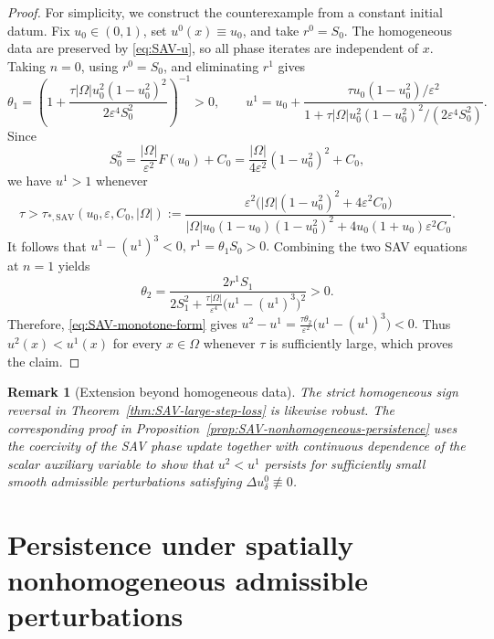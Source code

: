 \documentclass[final, 3p, times]{elsarticle}%
\newcommand{\eps}{\varepsilon}
\newtheorem{remark}[theorem]{Remark}
\begin{document}
\begin{proof}
For simplicity, we construct the counterexample from a constant initial
datum. Fix \(u_0\in(0,1)\), set \(u^0(x)\equiv u_0\), and take
\(r^0=S_0\). The homogeneous data are preserved by \eqref{eq:SAV-u}, so
all phase iterates are independent of \(x\). Taking \(n=0\), using
\(r^0=S_0\), and eliminating \(r^1\) gives
\begin{equation}
    \theta_1
    =\left(1+
    \frac{\tau|\Omega|u_0^2(1-u_0^2)^2}{2\eps^4S_0^2}\right)^{-1}>0,
    \qquad
    u^1
    =u_0+\frac{\tau u_0(1-u_0^2)/\eps^2}
    {1+\tau|\Omega|u_0^2(1-u_0^2)^2/(2\eps^4S_0^2)}.
    \label{eq:SAV-u1-tau}
\end{equation}
Since
\[
    S_0^2=\frac{|\Omega|}{\eps^2}F(u_0)+C_0
    =\frac{|\Omega|}{4\eps^2}(1-u_0^2)^2+C_0,
\]
we have \(u^1>1\) whenever
\begin{equation}
    \tau>\tau_{*,\mathrm{SAV}}(u_0,\eps,C_0,|\Omega|)
    :=
    \frac{\eps^2\bigl(|\Omega|(1-u_0^2)^2+4\eps^2C_0\bigr)}
    {|\Omega|u_0(1-u_0)(1-u_0^2)^2
    +4u_0(1+u_0)\eps^2C_0}.
    \label{eq:SAV-thm-threshold}
\end{equation}
It follows that
$u^1-(u^1)^3<0,\, r^1=\theta_1S_0>0.
$
Combining the two SAV equations at \(n=1\) yields
\[
    \theta_2
    =\frac{2r^1S_1}
    {2S_1^2+\frac{\tau|\Omega|}{\eps^4}
    \bigl(u^1-(u^1)^3\bigr)^2}>0.
\]
Therefore, \eqref{eq:SAV-monotone-form} gives
$
    u^2-u^1=\frac{\tau\theta_2}{\eps^2}\bigl(u^1-(u^1)^3\bigr)<0.
$
Thus \(u^2(x)<u^1(x)\) for every \(x\in\Omega\) whenever \(\tau\) is
sufficiently large, which proves the claim.
\end{proof}
\begin{remark}[Extension beyond homogeneous data]
The strict homogeneous sign reversal in Theorem~\ref{thm:SAV-large-step-loss}
is likewise robust. The corresponding proof in Proposition~\ref{prop:SAV-nonhomogeneous-persistence} uses the coercivity of the SAV phase
update together with continuous dependence of the scalar auxiliary variable
to show that \(u^2<u^1\) persists for sufficiently small smooth
admissible perturbations satisfying \(\Delta u^0_\delta\not\equiv0\).
\end{remark}



\section{Persistence under spatially nonhomogeneous admissible perturbations}
\label{sec:nonhomogeneous-persistence}
\end{document}
